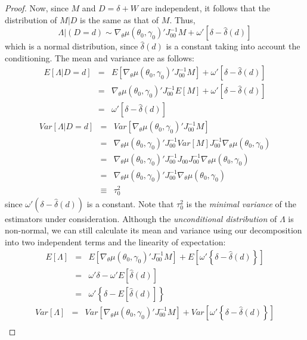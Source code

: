 \documentclass[12pt]{article}
\theoremstyle{definition}
\begin{document}
\begin{proof}
Now, since $M$ and $D = \delta + W$ are independent, it follows that the distribution of $M|D$ is the same as that of $M$. Thus, 
	$$
	\Lambda|(D=d) \sim  \nabla_\theta \mu(\theta_0,\gamma_0)' J_{00}^{-1} M + \omega' \left[\delta - \hat{\delta}(d) \right] 
$$
which is a normal distribution, since $\hat{\delta}(d)$ is a constant taking into account the conditioning. The mean and variance are as follows:
	\begin{eqnarray*}
	E\left[\Lambda  | D= d\right] &=& E\left[\nabla_\theta\mu(\theta_0, \gamma_0)' J_{00}^{-1}M\right] + \omega' \left[\delta - \hat{\delta}(d) \right] \\
				&=& \nabla_\theta\mu(\theta_0, \gamma_0)' J_{00}^{-1}E\left[M\right] + \omega' \left[\delta - \hat{\delta}(d) \right] \\
			&=& \omega' \left[\delta - \hat{\delta}(d) \right] 	
\end{eqnarray*}
	\begin{eqnarray*}
	Var\left[\Lambda  | D= d\right] &=& Var\left[\nabla_\theta\mu(\theta_0, \gamma_0)' J_{00}^{-1}M\right]\\
				&=& \nabla_\theta\mu(\theta_0, \gamma_0)' J_{00}^{-1}Var[M]J_{00}^{-1}\nabla_\theta\mu(\theta_0, \gamma_0)\\
				&=& \nabla_\theta\mu(\theta_0, \gamma_0)' J_{00}^{-1}J_{00}J_{00}^{-1}\nabla_\theta\mu(\theta_0, \gamma_0)\\
				&=& \nabla_\theta\mu(\theta_0, \gamma_0)' J_{00}^{-1}\nabla_\theta\mu(\theta_0, \gamma_0)\\
	&\equiv& \tau_0^2
\end{eqnarray*}
since $\omega'(\delta - \hat{\delta}(d) )$ is a constant. Note that $\tau^2_0$ is the \emph{minimal variance} of the estimators under consideration. Although the \emph{unconditional distribution} of $\Lambda$ is non-normal, we can still calculate its mean and variance using our decomposition into two independent terms and the linearity of expectation:
	\begin{eqnarray*}
	E\left[\Lambda\right] &=& E\left[\nabla_\theta\mu(\theta_0, \gamma_0)' J_{00}^{-1}M\right] + E\left[\omega' \left\{\delta - \hat{\delta}(d) \right\}\right] \\
			&=& \omega' \delta  -\omega'  E\left[\hat{\delta}(d)\right] \\	
			&=& \omega' \left\{\delta  - E\left[\hat{\delta}(d)\right]\right\}
\end{eqnarray*}
	\begin{eqnarray*}
	Var\left[\Lambda\right] &=& Var\left[\nabla_\theta\mu(\theta_0, \gamma_0)' J_{00}^{-1}M\right] + Var\left[\omega' \left\{\delta - \hat{\delta}(d) \right\}\right]\\

\end{eqnarray*}
\end{proof}
\end{document}
